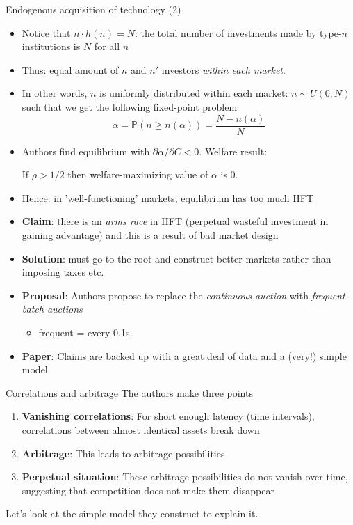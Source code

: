 \documentclass[english,10pt
,aspectratio=169
]{beamer}
\begin{document}
\begin{frame}{Endogenous acquisition of technology (2)}
	\begin{itemize}
		\item Notice that $n \cdot h(n)=N$: the total number of investments made by type-$n$ institutions is $N$ for all $n$
		\item Thus: equal amount of $n$ and $n'$ investors \textit{within each market}.
		\item In other words, $n$ is uniformly distributed within each market: $n \sim U(0,N)$ such that  we get the following fixed-point problem
		\[
		\alpha = \mathbb{P}(n \ge n(\alpha))=\frac{N-n(\alpha)}{N}
		\]
		\item Authors find equilibrium with $\partial \alpha / \partial C<0$. Welfare result:
		\begin{block}{}
			\begin{center}
				If $\rho>1/2$ then welfare-maximizing value of $\alpha$ is 0.
			\end{center}
		\end{block}
		\item Hence: in 'well-functioning' markets, equilibrium has too much HFT
	\end{itemize}
\end{frame}


\begin{frame}{\citet*{budish_high-frequency_2015}}
	\begin{itemize}
		\item \textbf{Claim}: there is an \textit{arms race} in HFT (perpetual wasteful investment in gaining advantage) and this is a result of bad market design
		\item \textbf{Solution}: must go to the root and construct better markets rather than imposing taxes etc.
		\item \textbf{Proposal}: Authors propose to replace the \textit{continuous auction} with \textit{frequent batch auctions}
		\begin{itemize}
			\item frequent = every 0.1s
		\end{itemize}
		\item \textbf{Paper}: Claims are backed up with a great deal of data and a (very!) simple model
	\end{itemize}
\end{frame}


\begin{frame}{Correlations and arbitrage}
	The authors make three points
	\begin{enumerate}
		\item \textbf{Vanishing correlations}: For short enough latency (time intervals), correlations between almost identical assets break down
		\item \textbf{Arbitrage}: This leads to arbitrage possibilities
		\item \textbf{Perpetual situation}: These arbitrage possibilities do not vanish over time, suggesting that competition does not make them disappear
	\end{enumerate}
	Let's look at the simple model they construct to explain it.
\end{frame}
\end{document}
